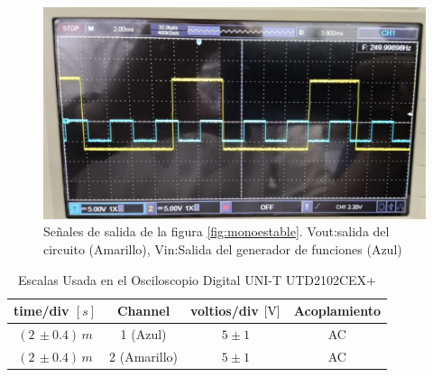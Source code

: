             
            \begin{figure}[H]
                \centering
                \renewcommand{\figurename}{Imagen}
                \includegraphics[width=15cm]{Imagenes/exp_monoestable_vin_vout.png}
                \caption{Señales de salida de la figura \ref{fig:monoestable}. Vout:salida del circuito (Amarillo), Vin:Salida del generador de funciones (Azul)}
                \label{fig:exp_monoestable_vin_vout}
            \end{figure}

            \begin{table}[H]
                \centering
                \begin{tabular}{|c|c|c|c|}
                    \hline
                    \textbf{time/div} $[s]$ & \textbf{Channel} & \textbf{voltios/div $[\volt]$} & \textbf{Acoplamiento} \\ \hline
                    $(2 \, \pm 0.4) \, m  $ & 1 (Azul)  &   $5 \pm 1   $ & AC \\ \hline  
                    $(2 \, \pm 0.4) \, m  $ & 2 (Amarillo)  &   $5 \pm 1   $ & AC \\ \hline  
                \end{tabular}
                \caption{Escalas Usada en el Osciloscopio Digital UNI-T UTD2102CEX+}
                \label{tab:escala_monoestable_vin_vout}
            \end{table}

